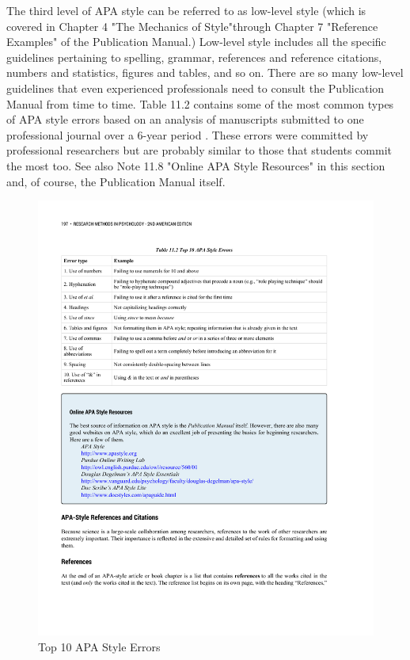 The third level of APA style can be referred to as low-level style (which is covered in Chapter 4 "The Mechanics of Style"through Chapter 7 "Reference Examples" of the Publication Manual.) Low-level style includes all the specific guidelines pertaining to spelling, grammar, references and reference citations, numbers and statistics, figures and tables, and so on. There are so many low-level guidelines that even experienced professionals need to consult the Publication Manual from time to time. Table 11.2 contains some of the most common types of APA style errors based on an analysis of manuscripts submitted to one professional journal over a 6-year period \citep{onwuegbuzie_evidence-based_2010}. These errors were committed by professional researchers but are probably similar to those that students commit the most too. See also Note 11.8 "Online APA Style Resources" in this section and, of course, the Publication Manual itself.



\begin{figure}
\includegraphics[width=\linewidth]{figures/C11mistakes.pdf}
\caption{Top 10 APA Style Errors}
\label{fig:mistakes}
\end{figure}


